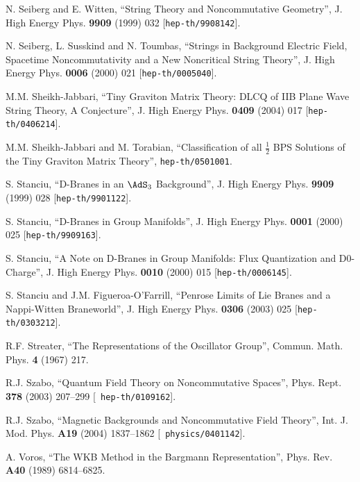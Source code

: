 \begin{thebibliography}{199}
 N. Seiberg and E. Witten, ``String Theory and
  Noncommutative Geometry'', J. High Energy Phys. {\bf 9909} (1999)
  032 [{\tt hep-th/9908142}].

 N. Seiberg, L. Susskind and N. Toumbas, ``Strings in
  Background Electric Field, Spacetime Noncommutativity and a New
  Noncritical String Theory'', J. High Energy Phys. {\bf 0006} (2000)
  021 [{\tt hep-th/0005040}].

 M.M. Sheikh-Jabbari, ``Tiny Graviton Matrix Theory:
  DLCQ of IIB Plane Wave String Theory, A Conjecture'', J. High Energy
  Phys. {\bf 0409} (2004) 017 [{\tt hep-th/0406214}].

 M.M. Sheikh-Jabbari and M. Torabian, ``Classification
  of all $\frac12$ BPS Solutions of the Tiny Graviton Matrix Theory'',
  {\tt hep-th/0501001}.

 S. Stanciu, ``D-Branes in an $\AdS_3$ Background'',
  J. High Energy Phys. {\bf 9909} (1999) 028 [{\tt hep-th/9901122}].

 S. Stanciu, ``D-Branes in Group Manifolds'',
  J. High Energy Phys. {\bf 0001} (2000) 025 [{\tt hep-th/9909163}].

 S. Stanciu, ``A Note on D-Branes in Group
  Manifolds: Flux Quantization and D0-Charge'', J. High Energy
  Phys. {\bf 0010} (2000) 015 [{\tt hep-th/0006145}].

 S. Stanciu and J.M. Figueroa-O'Farrill, ``Penrose Limits
  of Lie Branes and a Nappi-Witten Braneworld'', J. High Energy
  Phys. {\bf 0306} (2003) 025 [{\tt hep-th/0303212}].

 R.F. Streater, ``The Representations of the
  Oscillator Group'', Commun. Math. Phys. {\bf 4} (1967) 217.

 R.J. Szabo, ``Quantum Field Theory on Noncommutative
  Spaces'', Phys. Rept. {\bf 378} (2003) 207--299 [{\tt
    hep-th/0109162}].

 R.J. Szabo, ``Magnetic Backgrounds and Noncommutative
  Field Theory'', Int. J. Mod. Phys. {\bf A19} (2004) 1837--1862 [{\tt
    physics/0401142}].

 A. Voros, ``The WKB Method in the Bargmann
  Representation'', Phys. Rev. {\bf A40} (1989) 6814--6825.


\end{thebibliography}
